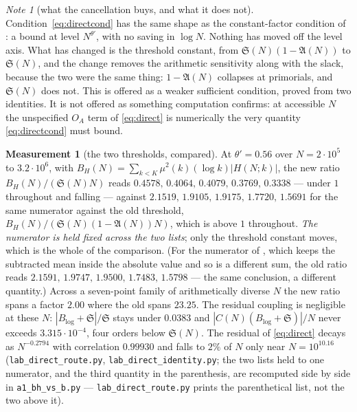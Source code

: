 \documentclass[11pt,a4paper]{article}
\theoremstyle{plain}
\theoremstyle{definition}
\newtheorem{measurement}[theorem]{Measurement}
\theoremstyle{remark}
\newtheorem{note}[theorem]{Note}
\renewcommand{\SS}{\mathfrak{S}}
\newcommand{\AAA}{\mathfrak{A}}
\begin{document}
\begin{note}[what the cancellation buys, and what it does not]
Condition~\eqref{eq:directcond} has the same shape as the
constant-factor condition of \cite[Prop.~6]{P1}: a bound at level
$N^{\theta'}$, with no saving in $\log N$. Nothing has moved off the
level axis. What has changed is the threshold constant, from
$\SS(N)(1-\AAA(N))$ to $\SS(N)$, and the change removes the arithmetic
sensitivity along with the slack, because the two were the same thing:
$1-\AAA(N)$ collapses at primorials, and $\SS(N)$ does not. This is
offered as a weaker sufficient condition, proved from two identities.
It is not offered as something computation confirms: at accessible $N$
the unspecified $O_A$ term of \eqref{eq:direct} is numerically the
very quantity \eqref{eq:directcond} must bound.
\end{note}

\begin{measurement}[the two thresholds, compared]\label{meas:direct}
At $\theta'=0.56$ over $N=2\cdot10^5$ to $3.2\cdot10^6$, with
$B_H(N)=\sum_{k<K}\mu^2(k)(\log k)|H(N;k)|$, the new ratio
$B_H(N)/(\SS(N)N)$ reads
$0.4578,\,0.4064,\,0.4079,\,0.3769,\,0.3338$ --- under $1$ throughout
and falling --- against
$2.1519,\,1.9105,\,1.9175,\,1.7720,\,1.5691$ for the same numerator
against the old threshold, $B_H(N)/(\SS(N)(1-\AAA(N))N)$, which is
above $1$ throughout. \emph{The numerator is held fixed across the two
lists}; only the threshold constant moves, which is the whole of the
comparison. (For the numerator of \cite[eq.~(9)]{P1}, which keeps the
subtracted mean inside the absolute value and so is a different sum,
the old ratio reads $2.1591,\,1.9747,\,1.9500,\,1.7483,\,1.5798$ ---
the same conclusion, a different quantity.) Across a
seven-point family of arithmetically diverse $N$ the new ratio spans a
factor $2.00$ where the old spans $23.25$. The residual coupling is
negligible at these $N$: $|B_{\log}+\SS|/\SS$ stays under $0.0383$ and
$|C(N)(B_{\log}+\SS)|/N$ never exceeds $3.315\cdot10^{-4}$, four
orders below $\SS(N)$. The residual of \eqref{eq:direct} decays as
$N^{-0.2794}$ with correlation $0.99930$ and falls to $2\%$ of $N$
only near $N=10^{10.16}$
(\texttt{lab\_direct\_route.py}, \texttt{lab\_direct\_identity.py};
the two lists held to one numerator, and the third quantity in the
parenthesis, are recomputed side by side in
\texttt{a1\_bh\_vs\_b.py} --- \texttt{lab\_direct\_route.py} prints
the parenthetical list, not the two above it).
\end{measurement}
\end{document}
